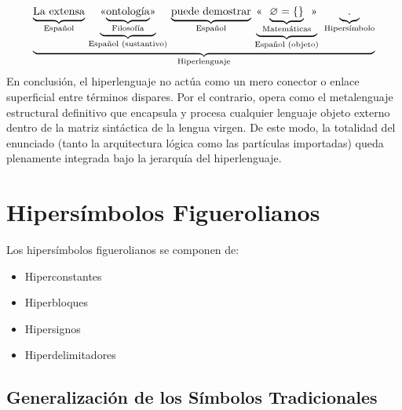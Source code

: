 \documentclass[12pt]{report}
\begin{document}
	\[
	\underset{\text{Hiperlenguaje}}{\underbrace{\underset{\text{Español}}{\underbrace{\vphantom{\text{Lg}}\text{La extensa}}}\text{ }\underset{\text{Español (sustantivo)}}{\underbrace{\text{<<}\underset{\text{Filosofía}}{\underbrace{\vphantom{\text{Lg}}\text{ontología}}}\text{>>}}}\text{ }\underset{\text{Español}}{\underbrace{\vphantom{\text{Lg}}\text{puede demostrar}}}\text{ }\underset{\text{Español (objeto)}}{\underbrace{\text{<<}\underset{\text{Matemáticas}}{\underbrace{\vphantom{\text{Lg}}\varnothing = \{\}}}\text{>>}}}\,\,\,\underset{\text{Hipersímbolo}}{\underbrace{\vphantom{\text{Lg}}\text{.}}}}}
	\]
	En conclusión, el hiperlenguaje no actúa como un mero conector o enlace superficial entre términos dispares. Por el contrario, opera como el metalenguaje estructural definitivo que encapsula y procesa cualquier lenguaje objeto externo dentro de la matriz sintáctica de la lengua virgen. De este modo, la totalidad del enunciado (tanto la arquitectura lógica como las partículas importadas) queda plenamente integrada bajo la jerarquía del hiperlenguaje.


	
	\section{Hipersímbolos Figuerolianos}\label{sec:hypersymbola}
	
	\begin{minidefin}
		Los hipersímbolos figuerolianos se componen de:
		\begin{itemize}
			\item Hiperconstantes
			\item Hiperbloques
			\item Hipersignos
			\item Hiperdelimitadores
		\end{itemize}
	\end{minidefin}
	
	\subsection{Generalización de los Símbolos Tradicionales}
	
\end{document}
